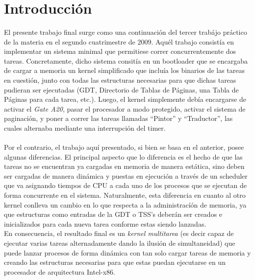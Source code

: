 \documentclass[11pt, a4paper]{article}
\begin{document}
	\maketitle

\small
\newpage \printindex \tableofcontents
\normalsize
\newpage

\section{Introducción}
\paragraph{}
El presente trabajo final surge como una continuación del tercer trabájo práctico de la materia en el segundo cuatrimestre de 2009. Aquél trabajo consistía en implementar un sistema minimal que permitiese correr concurrentemente dos tareas. Concretamente, dicho sistema consitía en un bootloader que se encargaba de cargar a memoria un kernel simplificado que incluía los binarios de las tareas en cuestión, junto con todas las estructuras necesarias para que dichas tareas pudieran ser ejecutadas (GDT, Directorio de Tablas de Páginas, una Tabla de Páginas para cada tarea, etc.). Luego, el kernel simplemente debía encargarse de activar el \textit{Gate A20}, pasar el procesador a modo protegido, activar el sistema de paginación, y poner a correr las tareas llamadas ``Pintor'' y ``Traductor'', las cuales alternaba mediante una interrupción del timer.

\paragraph{}
Por el contrario, el trabajo aquí presentado, si bien se basa en el anterior, posee algunas diferencias. El principal aspecto que lo diferencia es el hecho de que las tareas no se encuentran ya cargadas en memoria de manera estática, sino deben ser cargadas de manera dinámica y puestas en ejecución a través de un scheduler que va asignando tiempos de CPU a cada uno de los procesos que se ejecutan de forma concurrente en el sistema. Naturalmente, esta diferencia en cuanto al otro kernel conlleva un cambio en lo que respecta a la administracíón de memoria, ya que estructuras como entradas de la GDT o TSS's deberán ser creados e inicializados para cada nueva tarea conforme estas siendo lanzadas.\\
En consecuencia, el resultado final es un \textit{kernel multitarea} (es decir capaz de ejecutar varias tareas alternadamente dando la ilusión de simultaneidad) que puede lanzar procesos de forma dinámica con tan solo cargar tareas de memoria y creando las estructuras necesarias para que estas puedan ejecutarse en un procesador de arquitectura Intel-x86.
\end{document}
